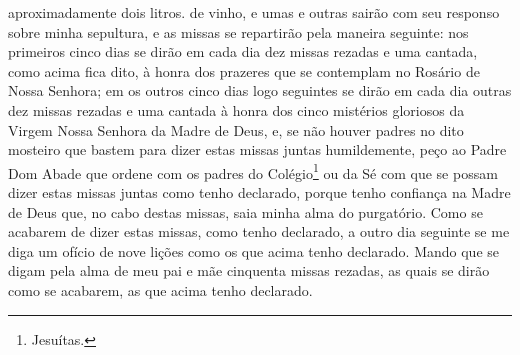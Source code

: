 \begin{linenumbers}
{aproximadamente dois litros.} de vinho, e umas e outras sairão com seu
responso sobre minha sepultura, e as missas se repartirão pela maneira
seguinte: nos primeiros cinco dias se dirão em cada dia dez missas
rezadas e uma cantada, como acima fica dito, à honra dos prazeres que
se contemplam no Rosário de Nossa Senhora; em os outros cinco dias logo
seguintes se dirão em cada dia outras dez missas rezadas e uma cantada
à honra dos cinco mistérios gloriosos da Virgem Nossa Senhora da Madre
de Deus, e, se não houver padres no dito mosteiro que bastem para dizer
estas missas juntas humildemente, peço ao Padre Dom Abade que ordene
com os padres do Colégio\footnote{ Jesuítas.} ou da Sé com que se
possam dizer estas missas juntas como tenho declarado, porque tenho
confiança na Madre de Deus que, no cabo destas missas, saia minha alma
do purgatório. Como se acabarem de dizer estas missas, como tenho
declarado, a outro dia seguinte se me diga um ofício de nove lições
como os que acima tenho declarado. Mando que se digam pela alma de meu
pai e mãe cinquenta missas rezadas, as quais se dirão como se acabarem,
as que acima tenho declarado. 


\end{linenumbers}
